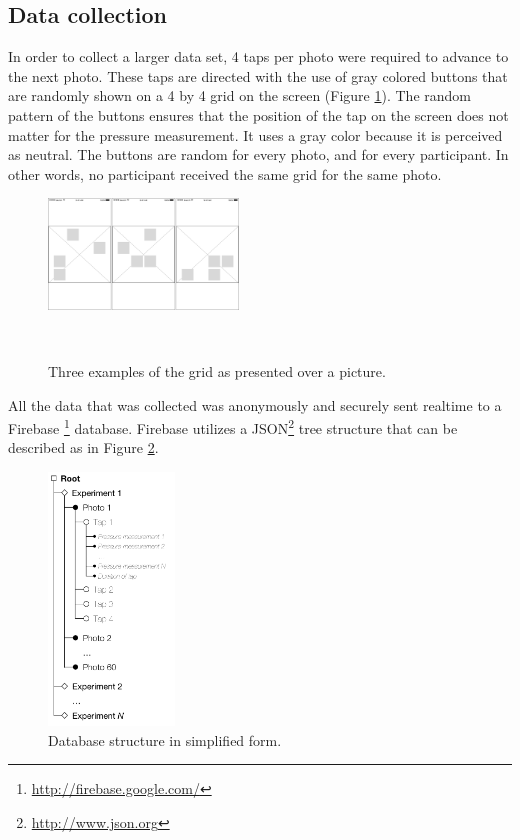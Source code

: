 \documentclass{sigchi}
\begin{document}
\subsection{Data collection} %
\label{sub:data_collection}
In order to collect a larger data set, 4 taps per photo were required to advance to the next photo. These taps are directed with the use of gray colored buttons that are randomly shown on a 4 by 4 grid on the screen (Figure \ref{fig:grid}). The random pattern of the buttons ensures that the position of the tap on the screen does not matter for the pressure measurement. It uses a gray color because it is perceived as neutral. The buttons are random for every photo, and for every participant. In other words, no participant received the same grid for the same photo.
\begin{figure}[h]
    \centering
    \includegraphics[width=0.45\textwidth]{images/Grid.png}
    \caption{Three examples of the grid as presented over a picture.}~
    \label{fig:grid}
\end{figure}

All the data that was collected was anonymously and securely sent realtime to a Firebase \footnote{\url{http://firebase.google.com/}} database. Firebase utilizes a JSON\footnote{\url{http://www.json.org}} tree structure that can be described as in Figure \ref{fig:datastructure}.
\begin{figure}[h]
    \centering
    \includegraphics[width=0.3\textwidth]{images/Datastructure.png}
    \caption{Database structure in simplified form.}
    \label{fig:datastructure}
\end{figure}
\end{document}
